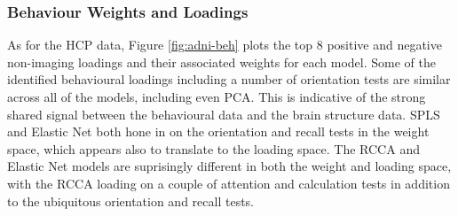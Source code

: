 \subsubsection{Behaviour Weights and Loadings}

As for the HCP data, Figure \ref{fig:adni-beh} plots the top 8 positive and negative non-imaging loadings and their associated weights for each model.
Some of the identified behavioural loadings including a number of orientation tests are similar across all of the models, including even PCA.
This is indicative of the strong shared signal between the behavioural data and the brain structure data.
SPLS and Elastic Net both hone in on the orientation and recall tests in the weight space, which appears also to translate to the loading space.
The RCCA and Elastic Net models are suprisingly different in both the weight and loading space, with the RCCA loading on a couple of attention and calculation tests in addition to the ubiquitous orientation and recall tests.

